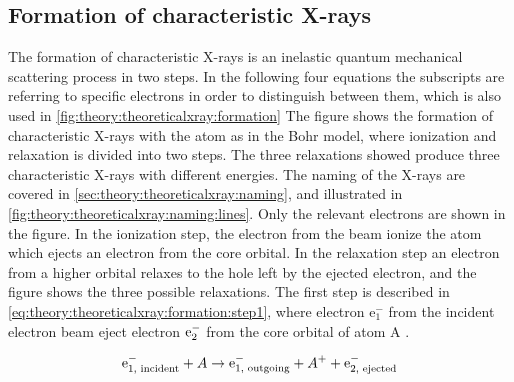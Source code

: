 \subsection{Formation of characteristic X-rays}
\label{sec:theory:theoreticalxray:formation}
The formation of characteristic X-rays is an inelastic quantum mechanical scattering process in two steps.
In the following four equations the subscripts are referring to specific electrons in order to distinguish between them, which is also used in \cref{fig:theory:theoreticalxray:formation}
The figure shows the formation of characteristic X-rays with the atom as in the Bohr model, where ionization and relaxation is divided into two steps.
The three relaxations showed produce three characteristic X-rays with different energies.
The naming of the X-rays are covered in \cref{sec:theory:theoreticalxray:naming}, and illustrated in \cref{fig:theory:theoreticalxray:naming:lines}.
Only the relevant electrons are shown in the figure.
In the ionization step, the electron from the beam ionize the atom which ejects an electron from the core orbital.
In the relaxation step an electron from a higher orbital relaxes to the hole left by the ejected electron, and the figure shows the three possible relaxations.
The first step is described in \cref{eq:theory:theoreticalxray:formation:step1}, where electron e$^-_{1}$ from the incident electron beam eject electron $\textnormal{e}^-_{2}$ from the core orbital of atom A \cite[Eq. (8.12)]{hollas_modern_2004}.



\begin{equation}
    \label{eq:theory:theoreticalxray:formation:step1}
    \textnormal{e}^-_{1 \textnormal{, incident}} + A \rightarrow \textnormal{e}^-_{1 \textnormal{, outgoing}} + A^+ + \textnormal{e}^-_{2 \textnormal{, ejected}}
\end{equation}


